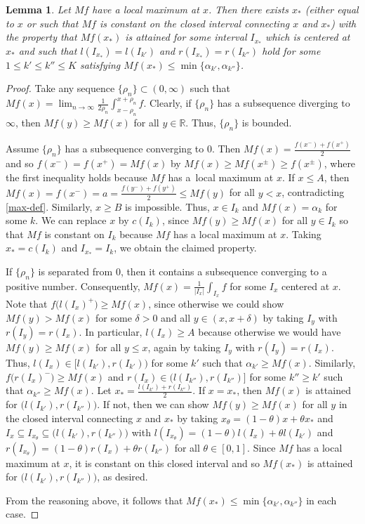 \documentclass[leqno,11pt]{amsart}
\numberwithin{equation}{section}
\numberwithin{theorem}{section}
\newtheorem{lemma}[theorem]{Lemma}
\newcommand{\RR}{\mathbb{R}}
\begin{document}
	\begin{lemma} \label{L2}
		Let $Mf$ have a local maximum at $x$. Then there exists $x_*$  (either equal to $x$ or such that $Mf$ is constant on the closed interval connecting $x$ and $x_*$) with the property that $Mf(x_*)$ is attained for some interval $I_{x_*}$ which is centered at $x_*$ and such that $l(I_{x_*}) = l(I_{k'})$ and $r(I_{x_*}) = r(I_{k''})$ hold for some $1\le k'\le k''\le K$ satisfying $Mf(x_*) \leq \min \{\alpha_{k'}, \alpha_{k''}\}$.
	\end{lemma} 
	\begin{proof}
		Take any sequence $\{\rho_n\}\subset (0,\infty)$ such that $Mf(x) = \lim_{n \to \infty} \frac{1}{2\rho_n} \int_{x-\rho_n}^{x+\rho_n} f$. Clearly, if $\{\rho_n\}$ has 
		a subsequence diverging to $\infty$, then $Mf(y) \geq Mf(x)$ for all $y \in \RR$. Thus,  $\{\rho_n\}$ is bounded. 
		
		Assume $\{\rho_n\}$ has a subsequence converging to $0$. Then $Mf(x) = \frac{f(x^-) + f(x^+)}{2}$ and so $f(x^-) = f(x^+) = Mf(x)$ by $Mf(x) \geq Mf(x^\pm) \geq f(x^\pm)$, where the first inequality holds because $Mf$ has a~local maximum at $x$. If $x \leq A$, then $Mf(x) = f(x^-) = a = \frac{f(y^-) + f(y^+)}{2} \leq Mf(y)$ for all $y < x$, contradicting \eqref{max-def}. Similarly, $x \geq B$ is impossible. Thus, $x \in I_k$ and $Mf(x) = \alpha_k$ for some $k$. We can replace $x$ by $c(I_k)$, since $Mf(y) \geq Mf(x)$ for all $y \in I_k$ so that $Mf$ is constant 
		on $I_k$ because $Mf$ has a local maximum at $x$. Taking $x_*=c(I_k)$ and $I_{x_*} = I_k$, we obtain the claimed property.
		
		If $\{\rho_n\}$ is separated from $0$, then it contains a subsequence converging to a positive number. Consequently, $Mf(x) = \frac{1}{|I_x|} \int_{I_x} f$ for some $I_x$ centered at $x$. Note that $f\big(l(I_x)^+\big) \geq M f(x)$, since otherwise we could show $M f(y) > Mf(x)$ for some $\delta > 0$ and all $y \in (x, x + \delta)$ by taking $I_y$ with $r(I_y) = r(I_x)$. In particular, $l(I_x) \geq A$ because otherwise we would have $Mf(y) \geq Mf(x)$ for all $y \leq x$, again by taking $I_y$ with $r(I_y) = r(I_x)$. 
		Thus, $l(I_x) \in \big[l(I_{k'}), r(I_{k'})\big)$ for some $k'$ such that $\alpha_{k'} \geq Mf(x)$. Similarly, $f\big(r(I_x)^-\big) \geq M f(x)$ and $r(I_x) \in \big(l(I_{k''}), r(I_{k''})\big]$ for some $k'' \geq k'$ such that $\alpha_{k''} \geq Mf(x)$. Let $x_* = \frac{l(I_{k'}) + r(I_{k''})}{2}$. If $x=x_*$, then $Mf(x)$ is attained for $\big(l(I_{k'}), r(I_{k''})\big)$. If not, then we can show $Mf(y) \geq Mf(x)$ for all $y$ in the closed interval connecting $x$ and $x_*$ by taking $x_\theta = (1-\theta) x + \theta x_*$ and $I_x \subseteq I_{x_\theta} \subseteq \big(l(I_{k'}), r(I_{k''})\big)$ with $l(I_{x_\theta})= (1-\theta) l(I_x) + \theta l(I_{k'})$ and $r(I_{x_\theta} ) = (1-\theta) r(I_x) + \theta r(I_{k''})$ for all $\theta \in [0,1]$. Since $Mf$ has a local maximum at $x$, it is constant on this closed interval and so $Mf(x_*)$ is attained for $\big(l(I_{k'}), r(I_{k''})\big)$, as desired.
		
		From the reasoning above, it follows that $Mf(x_*) \leq \min \{\alpha_{k'}, \alpha_{k''}\}$ in each case.  
	\end{proof} 
	
\end{document}
